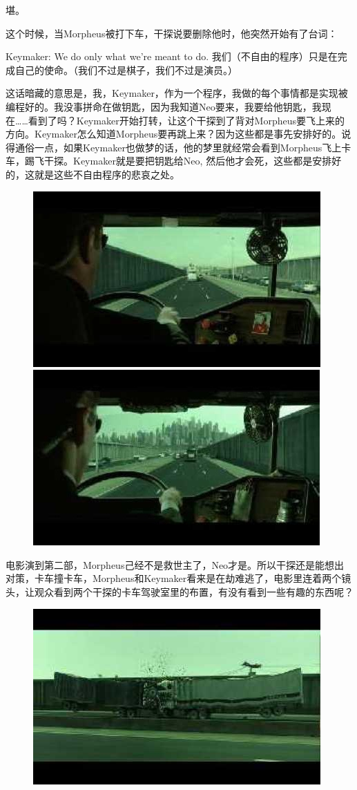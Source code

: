 \documentclass[UTF8]{ctexart}
\begin{document}
堪。

这个时候，当Morpheus被打下车，干探说要删除他时，他突然开始有了台词：

Keymaker: We do only what we're meant to do. 我们（不自由的程序）只是在完成自己的使命。（我们不过是棋子，我们不过是演员。）

这话暗藏的意思是，我，Keymaker，作为一个程序，我做的每个事情都是实现被编程好的。我没事拼命在做钥匙，因为我知道Neo要来，我要给他钥匙，我现在……看到了吗？Keymaker开始打转，让这个干探到了背对Morpheus要飞上来的方向。Keymaker怎么知道Morpheus要再跳上来？因为这些都是事先安排好的。说得通俗一点，如果Keymaker也做梦的话，他的梦里就经常会看到Morpheus飞上卡车，踢飞干探。Keymaker就是要把钥匙给Neo, 然后他才会死，这些都是安排好的，这就是这些不自由程序的悲哀之处。

\begin{figure}[htb]
\centering
\includegraphics[width=0.45\linewidth]{fig/read_reloaded-139}
\includegraphics[width=0.45\linewidth]{fig/read_reloaded-139-1}
\end{figure}

电影演到第二部，Morpheus己经不是救世主了，Neo才是。所以干探还是能想出对策，卡车撞卡车，Morpheus和Keymaker看来是在劫难逃了，电影里连着两个镜头，让观众看到两个干探的卡车驾驶室里的布置，有没有看到一些有趣的东西呢？

\begin{figure}[htb]
\centering
\includegraphics[width=0.5\linewidth]{fig/read_reloaded-140}
\end{figure}
\end{document}
